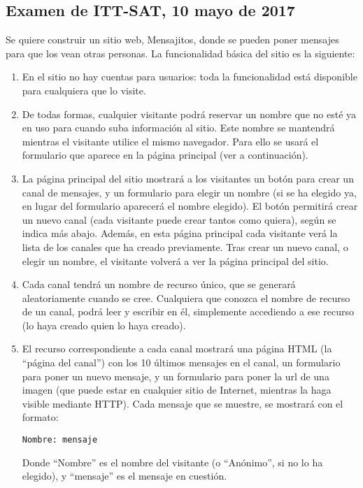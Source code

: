 \subsection{Examen de ITT-SAT, 10 mayo de 2017}

Se quiere construir un sitio web, Mensajitos, donde se pueden poner mensajes para que los vean otras personas. La funcionalidad básica del sitio es la siguiente:

\begin{enumerate}
\item En el sitio no hay cuentas para usuarios: toda la funcionalidad está disponible para cualquiera que lo visite.
\item De todas formas, cualquier visitante podrá reservar un nombre que no esté ya en uso para cuando suba información al sitio. Este nombre se mantendrá mientras el visitante utilice el mismo navegador. Para ello se usará el formulario que aparece en la página principal (ver a continuación).
\item La página principal del sitio mostrará a los visitantes un botón para crear un canal de mensajes, y un formulario para elegir un nombre (si se ha elegido ya, en lugar del formulario aparecerá el nombre elegido). El botón permitirá crear un nuevo canal (cada visitante puede crear tantos como quiera), según se indica más abajo. Además, en esta página principal cada visitante verá la lista de los canales que ha creado previamente. Tras crear un nuevo canal, o elegir un nombre, el visitante volverá a ver la página principal del sitio.
\item Cada canal tendrá un nombre de recurso único, que se generará aleatoriamente cuando se cree. Cualquiera que conozca el nombre de recurso de un canal, podrá leer y escribir en él, simplemente accediendo a ese recurso (lo haya creado quien lo haya creado).
\item El recurso correspondiente a cada canal mostrará una página HTML (la ``página del canal'') con los 10 últimos mensajes en el canal, un formulario para poner un nuevo mensaje, y un formulario para poner la url de una imagen (que puede estar en cualquier sitio de Internet, mientras la haga visible mediante HTTP). Cada mensaje que se muestre, se mostrará con el formato:

\begin{verbatim}
Nombre: mensaje
\end{verbatim}

Donde ``Nombre'' es el nombre del visitante (o ``Anónimo'', si no lo ha elegido), y ``mensaje'' es el mensaje en cuestión.


\end{enumerate}
